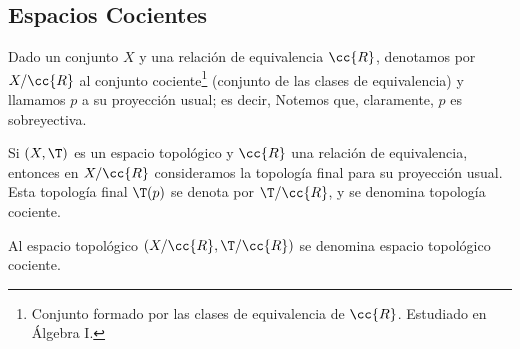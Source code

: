 \subsection{Espacios Cocientes}
\begin{notacion}
    Dado un conjunto $X$ y una relación de equivalencia $\cc{R}$, denotamos por $ X/\cc{R}$ al conjunto cociente\footnote{Conjunto formado por las clases de equivalencia de $\cc{R}$. Estudiado en Álgebra I.} (conjunto de las clases de equivalencia) y llamamos $p$ a su proyección usual; es decir,
    Notemos que, claramente, $p$ es sobreyectiva.
\end{notacion}

\begin{definicion}
    Si $(X,\T)$ es un espacio topológico y $\cc{R}$ una relación de equivalencia, entonces en $X/\cc{R}$ consideramos la topología final para su proyección usual. Esta topología final $\T(p)$ se denota por $\T/\cc{R}$, y se denomina topología cociente.

    Al espacio topológico $(X/\cc{R}, \T/\cc{R})$ se denomina espacio topológico cociente.
\end{definicion}


